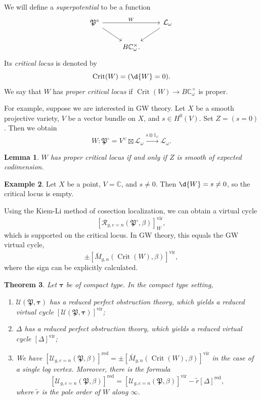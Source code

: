 \documentclass{amsart}
\newtheorem{thm}{Theorem}[section]
\newtheorem{lem}[thm]{Lemma}
\theoremstyle{definition}
\newtheorem{exm}[thm]{Example}
\theoremstyle{remark}
\theoremstyle{plain}
\theoremstyle{definition}
\theoremstyle{remark}
\newcommand{\C}{\mathbb{C}}
\newcommand{\mc}[1]{\mathcal{#1}}
\newcommand{\mf}[1]{\mathfrak{#1}}
\newcommand{\mr}[1]{\mathrm{#1}}
\newcommand{\on}[1]{\operatorname{#1}}
\newcommand{\1}{\mathbf{1}}
\newcommand{\2}{\mathbf{2}}
\newcommand{\3}{\mathbf{3}}
\newcommand{\vir}{\mr{vir}}
\begin{document}
We will define a \textit{superpotential} to be a function
\begin{equation*}
\begin{tikzcd}
    \mf{P}^{\circ} \ar{rr}{W} \ar{dr} && \mc{L}_{\omega} \ar{dl} \\
    & B \C_{\omega}^{\times}.
\end{tikzcd}
\end{equation*}
Its \textit{critical locus} is denoted by 
\[ \on{Crit}(W) = (\d{W} = 0). \]
We say that \(W\) has \textit{proper critical locus} if \(\on{Crit}(W) \to B\C_{\omega}^{\times}\) is proper.

For example, suppose we are interested in GW theory. Let \(X\) be a smooth projective variety, \(V\) be a vector bundle on \(X\), and \(s \in H^0(V)\). Set \(Z = (s = 0)\). Then we obtain
\[ W \colon \mf{P}^{\circ} = V^{\vee} \boxtimes \mc{L}_{\omega} \xrightarrow{s \otimes 1_{\omega}} \mc{L}_{\omega}. \]

\begin{lem}
    \(W\) has proper critical locus if and only if \(Z\) is smooth of expected codimension.
\end{lem}

\begin{exm}
    Let \(X\) be a point, \(V = \C\), and \(s \neq 0\). Then \(\d{W} = s \neq 0\), so the critical locus is empty.
\end{exm}

Using the Kiem-Li method of cosection localization, we can obtain a virtual cycle
\[ [\mc{R}_{g, c=n}(\mf{P}^{\circ}, \beta)]_W^{\vir}, \]
which is supported on the critical locus. In GW theory, this equals the GW virtual cycle, 
\[ \pm [\bar{M}_{g,n}(\on{Crit}(W), \beta)]^{\vir}, \]
where the sign can be explicitly calculated.

\begin{thm}
    Let \(\bm{\tau}\) be of compact type. In the compact type setting, 
    \begin{enumerate}
        \item \(\mc{U}(\mf{P}, \bm{\tau})\) has a reduced perfect obstruction theory, which yields a reduced virtual cycle \([\mc{U}(\mf{P}, \bm{\tau})]^{\vir}\);
        \item \(\Delta\) has a reduced perfect obstruction theory, which yields a reduced virtual cycle \([\Delta]^{\vir}\);
        \item We have \([\mc{U}_{g, c=n}(\mf{P}, \beta)]^{\on{red}} = \pm [\bar{M}_{g,n}(\on{Crit}(W), \beta)]^{\vir}\) in the case of a single log vertex. Moreover, there is the formula
            \[ [\mc{U}_{g, c=n}(\mf{P}, \beta)]^{\on{red}} = [\mc{U}_{g, c=n}(\mf{P}, \beta)]^{\vir} - \tilde{r} [\Delta]^{\on{red}}, \]
            where \(\tilde{r}\) is the pole order of \(W\) along \(\infty\).
    \end{enumerate}
\end{thm}
\end{document}
